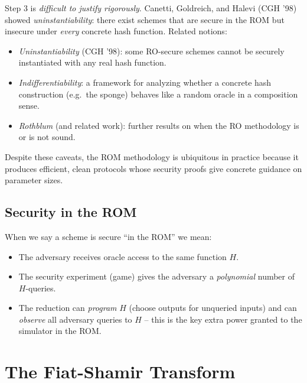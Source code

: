 \documentclass[11pt]{article}
\begin{document}
\begin{remark}
  Step 3 is \emph{difficult to justify rigorously}.  Canetti, Goldreich,
  and Halevi (CGH '98)~\cite{CGH98} showed \emph{uninstantiability}:
  there exist schemes that are secure in the ROM but insecure under
  \emph{every} concrete hash function.  Related notions:
  \begin{itemize}
    \item \textit{Uninstantiability} (CGH '98): some RO-secure schemes
          cannot be securely instantiated with any real hash function.
    \item \textit{Indifferentiability}: a framework for analyzing whether
          a concrete hash construction (e.g.\ the sponge) behaves like a
          random oracle in a composition sense.
    \item \textit{Rothblum} (and related work): further results on when
          the RO methodology is or is not sound.
  \end{itemize}
  Despite these caveats, the ROM methodology is ubiquitous in practice
  because it produces efficient, clean protocols whose security proofs
  give concrete guidance on parameter sizes.
\end{remark}

\subsection{Security in the ROM}

When we say a scheme is secure ``in the ROM'' we mean:

\begin{itemize}
  \item The adversary receives oracle access to the same function $H$.
  \item The security experiment (game) gives the adversary a
        \emph{polynomial} number of $H$-queries.
  \item The reduction can \emph{program} $H$ (choose outputs for
        unqueried inputs) and can \emph{observe} all adversary queries to
        $H$ -- this is the key extra power granted to the simulator in the
        ROM.
\end{itemize}

\section{The Fiat-Shamir Transform}
\end{document}
